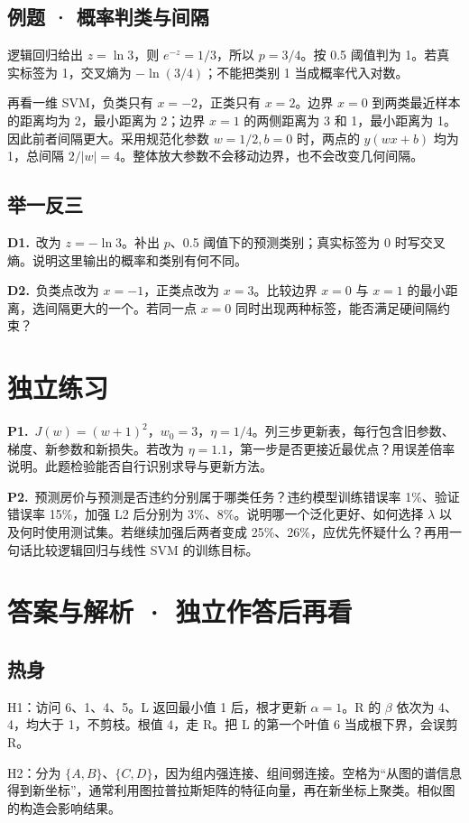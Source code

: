 \documentclass[UTF8,a4paper,11pt]{ctexart}
\newcommand{\CompactQuestion}[2]{\par\noindent\textbf{#1.}\ #2\par\vspace{.8em}}
\begin{document}
\subsection{例题 · 概率判类与间隔}
逻辑回归给出 $z=\ln3$，则 $e^{-z}=1/3$，所以 $p=3/4$。按 0.5 阈值判为 1。若真实标签为 1，交叉熵为 $-\ln(3/4)$；不能把类别 1 当成概率代入对数。

再看一维 SVM，负类只有 $x=-2$，正类只有 $x=2$。边界 $x=0$ 到两类最近样本的距离均为 2，最小距离为 2；边界 $x=1$ 的两侧距离为 3 和 1，最小距离为 1。因此前者间隔更大。采用规范化参数 $w=1/2,b=0$ 时，两点的 $y(wx+b)$ 均为 1，总间隔 $2/|w|=4$。整体放大参数不会移动边界，也不会改变几何间隔。

\subsection{举一反三}
\CompactQuestion{D1}{改为 $z=-\ln3$。补出 $p$、0.5 阈值下的预测类别；真实标签为 0 时写交叉熵。说明这里输出的概率和类别有何不同。}
\CompactQuestion{D2}{负类点改为 $x=-1$，正类点改为 $x=3$。比较边界 $x=0$ 与 $x=1$ 的最小距离，选间隔更大的一个。若同一点 $x=0$ 同时出现两种标签，能否满足硬间隔约束？}
\clearpage
\section{独立练习}
\CompactQuestion{P1}{$J(w)=(w+1)^2$，$w_0=3$，$\eta=1/4$。列三步更新表，每行包含旧参数、梯度、新参数和新损失。若改为 $\eta=1.1$，第一步是否更接近最优点？用误差倍率说明。此题检验能否自行识别求导与更新方法。}
\CompactQuestion{P2}{预测房价与预测是否违约分别属于哪类任务？违约模型训练错误率 1\%、验证错误率 15\%，加强 L2 后分别为 3\%、8\%。说明哪一个泛化更好、如何选择 $\lambda$ 以及何时使用测试集。若继续加强后两者变成 25\%、26\%，应优先怀疑什么？再用一句话比较逻辑回归与线性 SVM 的训练目标。}
\clearpage
\section{答案与解析 · 独立作答后再看}
\subsection{热身}
H1：访问 6、1、4、5。L 返回最小值 1 后，根才更新 $\alpha=1$。R 的 $\beta$ 依次为 4、4，均大于 1，不剪枝。根值 4，走 R。把 L 的第一个叶值 6 当成根下界，会误剪 R。

H2：分为 $\{A,B\}$、$\{C,D\}$，因为组内强连接、组间弱连接。空格为“从图的谱信息得到新坐标”，通常利用图拉普拉斯矩阵的特征向量，再在新坐标上聚类。相似图的构造会影响结果。
\end{document}
